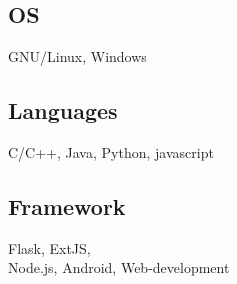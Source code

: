 
\horizontalLineLeft

\subsection{OS}
GNU/Linux, Windows
\vspace{6pt}

\subsection{Languages}
C/C++, Java, Python, javascript
\vspace{6pt}

\subsection{Framework}
Flask, ExtJS, \\Node.js, Android,
Web-development
\vspace{6pt}

%
\sectionsep